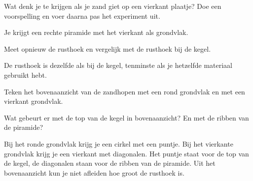\documentclass{ximera}
\begin{document}
\author{Alexander Holvoet}

\begin{exercise}
    Wat denk je te krijgen als je zand giet op een vierkant plaatje? Doe een voorspelling
    en voer daarna pas het experiment uit.
    \begin{oplossing}
        Je krijgt een rechte piramide met het vierkant als grondvlak.
    \end{oplossing}
\end{exercise}


\begin{exercise}
    Meet opnieuw de rusthoek en vergelijk met de rusthoek bij de kegel.
    \begin{oplossing}
        De rusthoek is dezelfde als bij de kegel, tenminste als je hetzelfde materiaal
        gebruikt hebt.
    \end{oplossing}
\end{exercise}

\begin{exercise}
    Teken het bovenaanzicht van de zandhopen met een rond grondvlak en met een vierkant
    grondvlak.
    \begin{hint}
        Wat gebeurt er met de top van de kegel in bovenaanzicht? En met de ribben van de
        piramide?
    \end{hint}
    \begin{oplossing}
        Bij het ronde grondvlak krijg je een cirkel met een puntje. Bij het vierkante
        grondvlak krijg je een vierkant met diagonalen. Het puntje staat voor de top van
        de kegel, de diagonalen staan voor de ribben van de piramide. Uit het bovenaanzicht
        kun je niet afleiden hoe groot de rusthoek is.
    \end{oplossing}
\end{exercise}

\end{document}
